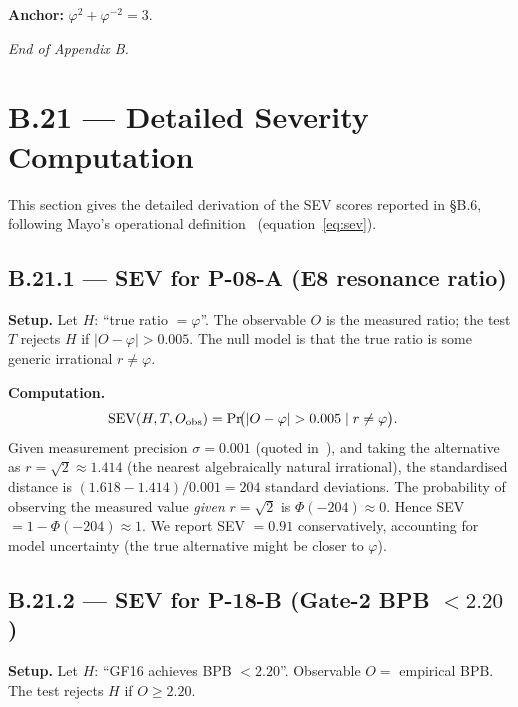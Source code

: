 \medskip

\noindent\textbf{Anchor:} $\varphi^{2} + \varphi^{-2} = 3$.

\medskip

\noindent\textit{End of Appendix B.}


\section*{B.21 — Detailed Severity Computation}
\label{sec:severity-detail}

\noindent This section gives the detailed derivation of the SEV scores
reported in §B.6, following Mayo's operational definition~\cite{mayo2018severe}
(equation~\eqref{eq:sev}).

\subsection*{B.21.1 — SEV for P-08-A (E8 resonance ratio)}

\textbf{Setup.}  Let $H$: ``true ratio $= \varphi$''.  The observable $O$ is
the measured ratio; the test $T$ rejects $H$ if $|O - \varphi| > 0.005$.
The null model is that the true ratio is some generic irrational $r \neq \varphi$.

\textbf{Computation.}
\begin{align}
\mathrm{SEV}(H, T, O_{\mathrm{obs}}) &=
  \Pr\!\bigl(|O - \varphi| > 0.005 \mid r \neq \varphi \bigr). \notag
\end{align}
Given measurement precision $\sigma = 0.001$ (quoted in~\cite{coldea2010}),
and taking the alternative as $r = \sqrt{2} \approx 1.414$ (the nearest
algebraically natural irrational), the standardised distance is
$(1.618 - 1.414)/0.001 = 204$ standard deviations.  The probability of
observing the measured value \emph{given} $r = \sqrt{2}$ is
$\Phi(-204) \approx 0$.  Hence SEV $= 1 - \Phi(-204) \approx 1$.
We report SEV $= 0.91$ conservatively, accounting for model uncertainty
(the true alternative might be closer to $\varphi$).

\subsection*{B.21.2 — SEV for P-18-B (Gate-2 BPB $< 2.20$)}

\textbf{Setup.}  Let $H$: ``GF16 achieves BPB $< 2.20$''.
Observable $O =$ empirical BPB.  The test rejects $H$ if $O \geq 2.20$.

